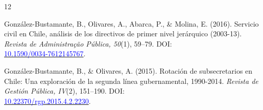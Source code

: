\begin{publications}
\begin{benumerate}{12}
\item{González-Bustamante, B., Olivares, A., Abarca, P., \& Molina, E. (2016). Servicio civil en Chile, análisis de los directivos de primer nivel jerárquico (2003-13). {\itshape Revista de Administra\c{c}\~ao Pública, 50}(1), 59--79. DOI: \\ \href{http://dx.doi.org/10.1590/0034-7612145767}{\textcolor{blue}{10.1590/0034-7612145767}}.} \vspace{1mm}

\item{González-Bustamante, B., \& Olivares, A. (2015). Rotación de subsecretarios en Chile: Una exploración de la segunda línea gubernamental, 1990-2014. {\itshape Revista de Gestión Pública, IV}(2), 151--190. DOI: \\ \href{https://doi.org/10.22370/rgp.2015.4.2.2230}{\textcolor{blue}{10.22370/rgp.2015.4.2.2230}}.} \vspace{1mm}

\end{benumerate}

\end{publications}



